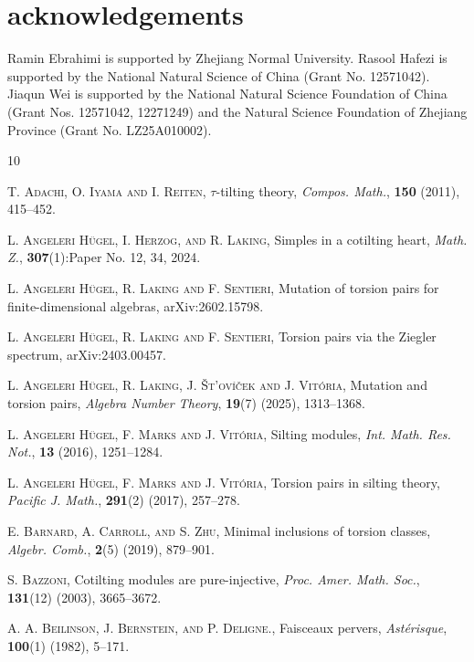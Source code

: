 \documentclass[12pt]{amsart}
\numberwithin{equation}{section}
\theoremstyle{definition}
\newtheorem*{theorem 0*}{Theorem}
\newtheorem*{theorem a*}{Theorem A}
\newtheorem*{theorem b*}{Theorem B}
\numberwithin{diagram}{section}
\begin{document}
	\section*{acknowledgements}
Ramin Ebrahimi is supported by Zhejiang Normal University.
Rasool Hafezi is supported by the National Natural Science of China (Grant No. 12571042).
Jiaqun Wei is supported by the National Natural Science Foundation of China (Grant Nos. 12571042, 12271249) and the Natural Science Foundation of Zhejiang Province (Grant No. LZ25A010002).
	
	
	
	\begin{thebibliography}{10}
		
		
		 \textsc{T. Adachi, O. Iyama and I. Reiten}, $\tau$-tilting theory, \emph{Compos. Math.}, \textbf{150} (2011), 415--452.
		
		 \textsc{L. Angeleri H{\"u}gel, I. Herzog, and R. Laking}, Simples in a cotilting heart, \emph{Math. Z.}, \textbf{307}(1):Paper No. 12, 34, 2024.  
	
	     \textsc{L. Angeleri H{\"u}gel, R. Laking and F. Sentieri}, Mutation of torsion pairs for finite-dimensional algebras, arXiv:2602.15798.
		
		 \textsc{L. Angeleri H{\"u}gel, R. Laking and F. Sentieri}, Torsion pairs via the Ziegler spectrum, arXiv:2403.00457.
	
	 \textsc{L. Angeleri H{\"u}gel, R. Laking, J. {\v{S}}t'ov{\'\i}{\v{c}}ek and J. Vit{\'o}ria}, Mutation and torsion pairs, \emph{Algebra Number Theory}, \textbf{19}(7) (2025), 1313--1368.
		
		 \textsc{L. Angeleri H{\"u}gel, F. Marks and J. Vitória}, Silting modules, \emph{Int. Math. Res. Not.}, \textbf{13} (2016), 1251--1284.
	
	     \textsc{L. Angeleri H{\"u}gel, F. Marks and J. Vitória}, Torsion pairs in silting theory, \emph{Pacific J. Math.}, \textbf{291}(2) (2017), 257--278.
		
		 \textsc{E. Barnard, A. Carroll, and S. Zhu}, Minimal inclusions of torsion classes, \emph{Algebr. Comb.}, \textbf{2}(5) (2019), 879--901.
	
	    \textsc{S. Bazzoni}, Cotilting modules are pure-injective, \emph{Proc. Amer. Math. Soc.}, \textbf{131}(12) (2003), 3665--3672.
		
		 \textsc{A. A. Beilinson, J. Bernstein, and P. Deligne.}, Faisceaux pervers, \emph{Ast{\'e}risque}, \textbf{100}(1) (1982), 5--171.
		

\end{thebibliography}
\end{document}
